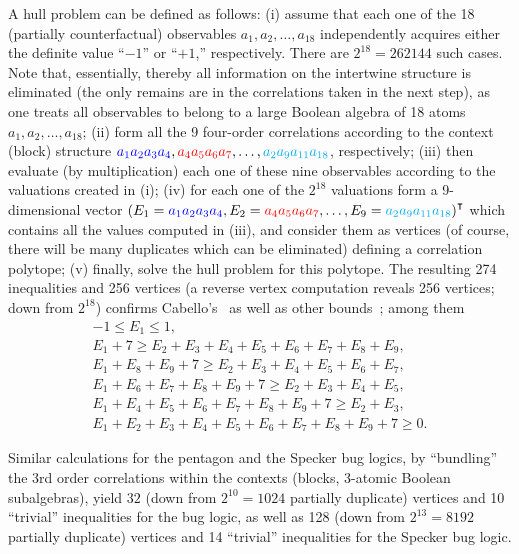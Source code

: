 \documentclass[%
  twocolumn,
 showpacs,
 showkeys,
 preprintnumbers,
 amsmath,amssymb,
 aps,
  pra,
  longbibliography,
 floatfix,
 ]{revtex4-1}
\begin{document}
A hull problem can be defined as follows:
(i) assume that each one of the 18 (partially counterfactual) observables
$a_1,a_2, \ldots ,a_{18}$ independently acquires either the definite value
``$-1$''
or
``$+1$,'' respectively.
There are $2^{18}=262144$ such cases. Note that, essentially, thereby all information on the intertwine structure is eliminated
(the only remains are in the correlations taken in the next step),
as one treats all observables to belong to a large Boolean algebra of 18 atoms  $a_1,a_2, \ldots ,a_{18}$;
(ii) form all the 9 four-order correlations according to the context (block) structure
${\color{blue}a_1 a_2 a_3 a_4}, {\color{red}a_4 a_5 a_6 a_7}, \ldots , {\color{cyan}a_2 a_9 a_{11} a_{18}}$, respectively;
(iii) then evaluate (by multiplication) each one of these nine observables according to the valuations created in (i);
(iv) for each one of the $2^{18}$ valuations form a 9-dimensional vector
$\left( E_1 ={\color{blue}a_1 a_2 a_3 a_4}, E_2={\color{red}a_4 a_5 a_6 a_7}, \ldots , E_9={\color{cyan}a_2 a_9 a_{11} a_{18}}\right)^\intercal$
which contains all the values computed in (iii),
and consider them as vertices (of course, there will be many duplicates which can be eliminated) defining a correlation polytope;
(v) finally, solve the hull problem for this polytope.
The resulting 274 inequalities and 256 vertices (a reverse vertex computation reveals 256 vertices; down from $2^{18}$)
confirms  Cabello's~\cite{cabello:210401}
as well as other bounds~\cite[Eqs.~(8)]{svozil-2016-s}; among them
\begin{equation}
\begin{split}
-1 \leq  E_1 \leq 1, \\
E_1+7\geq E_2+E_3+E_4+E_5+E_6+E_7+E_8+E_9, \\
E_1+E_8+E_9+7\geq E_2+E_3+E_4+E_5+E_6+E_7, \\
E_1+E_6+E_7+E_8+E_9+7\geq E_2+E_3+E_4+E_5, \\
E_1+E_4+E_5+E_6+E_7+E_8+E_9+7\geq E_2+E_3, \\
E_1+E_2+E_3+E_4+E_5+E_6+E_7+E_8+E_9+7\geq 0
.
\end{split}
\label{2015-s-e11}
\end{equation}

Similar calculations for the pentagon and the Specker bug logics,
by ``bundling'' the 3rd order correlations within the contexts (blocks, 3-atomic Boolean subalgebras), yield
$32$
(down from $2^{10}=1024$ partially duplicate)
vertices and 10 ``trivial'' inequalities for the bug logic,
as well as 128
(down from $2^{13}=8192$ partially duplicate)
vertices and 14 ``trivial'' inequalities for the Specker bug logic.
\end{document}
